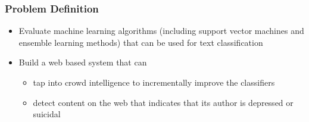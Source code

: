 \documentclass{beamer}
\begin{document}
    \begin{frame}
        \frametitle{Problem Definition}
        \begin{itemize}
            \item{Evaluate machine learning algorithms (including support vector machines and ensemble learning methods) that can be used for text classification}
            \item{
            Build a web based system that can
            \begin{itemize}
                \item{tap into crowd intelligence to incrementally improve the classifiers}
                \item{detect content on the web that indicates that its author is depressed or suicidal}
            \end{itemize}
            }
        \end{itemize}
    \end{frame}
\end{document}
